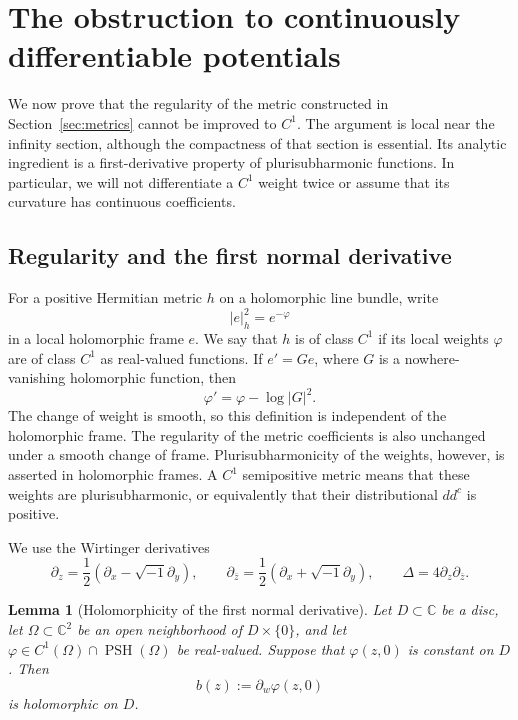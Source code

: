 \documentclass[11pt,a4paper]{article}
\numberwithin{equation}{section}
\newtheorem{lemma}[theorem]{Lemma}
\theoremstyle{definition}
\theoremstyle{remark}
\newcommand{\C}{\mathbb C}
\newcommand{\ddc}{dd^{c}}
\DeclareMathOperator{\PSH}{PSH}
\begin{document}
\section{The obstruction to continuously differentiable potentials}
\label{obs:section}

We now prove that the regularity of the metric constructed in
Section~\ref{sec:metrics} cannot be
improved to $C^1$.  The argument is local near the infinity section, although
the compactness of that section is essential.  Its analytic ingredient is a
first-derivative property of plurisubharmonic functions.  In particular, we
will not differentiate a $C^1$ weight twice or assume that its curvature has
continuous coefficients.

\subsection{Regularity and the first normal derivative}

For a positive Hermitian metric $h$ on a holomorphic line bundle, write
\[
   |e|_h^2=e^{-\varphi}
\]
in a local holomorphic frame $e$.  We say that $h$ is of class $C^1$ if its
local weights $\varphi$ are of class $C^1$ as real-valued functions.  If
$e'=G e$, where $G$ is a nowhere-vanishing holomorphic function, then
\[
   \varphi'=\varphi-\log|G|^2.
\]
The change of weight is smooth, so this definition is independent of the
holomorphic frame.  The regularity of the metric coefficients is also
unchanged under a smooth change of frame.  Plurisubharmonicity of the
weights, however, is asserted in holomorphic frames.  A $C^1$ semipositive
metric means that these weights are plurisubharmonic, or equivalently that
their distributional $\ddc$ is positive.

We use the Wirtinger derivatives
\[
  \partial_z=\frac12(\partial_x-\sqrt{-1}\partial_y),
  \qquad
  \partial_{\bar z}=\frac12(\partial_x+\sqrt{-1}\partial_y),
  \qquad \Delta=4\partial_z\partial_{\bar z}.
\]

\begin{lemma}[Holomorphicity of the first normal derivative]
\label{obs:first-jet}
Let $D\subset\C$ be a disc, let $\Omega\subset\C^2$ be an open
neighborhood of $D\times\{0\}$, and let
$\varphi\in C^1(\Omega)\cap\PSH(\Omega)$ be real-valued.  Suppose that
$\varphi(z,0)$ is constant on $D$.  Then
\[
                  b(z):=\partial_w\varphi(z,0)
\]
is holomorphic on $D$.
\end{lemma}
\end{document}
